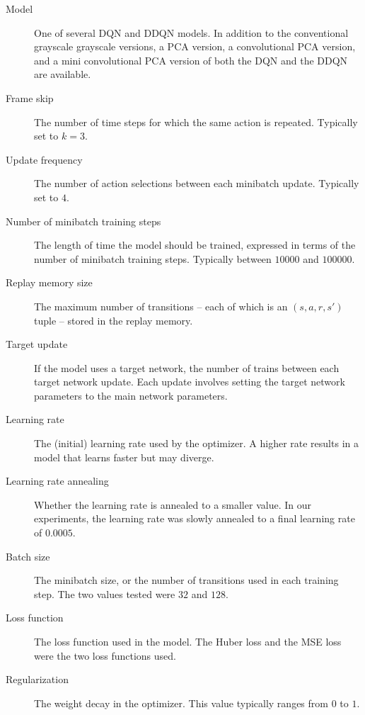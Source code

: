 \documentclass[11pt, twocolumn]{article}
\begin{document}
\begin{description}
    \item[Model] One of several DQN and DDQN models. In addition to
the conventional grayscale grayscale versions, a PCA version, a
convolutional PCA version, and a mini convolutional PCA version of
both the DQN and the DDQN are available.
    
    \item[Frame skip] The number of time steps for which the same
action is repeated. Typically set to $k = 3$.
    
    \item[Update frequency] The number of action selections between
each minibatch update. Typically set to $4$.
    
    \item[Number of minibatch training steps] The length of time the
model should be trained, expressed in terms of the number of minibatch
training steps. Typically between $10000$ and $100000$.
    
    \item[Replay memory size] The maximum number of transitions --
each of which is an $(s, a, r, s')$ tuple -- stored in the replay
memory.
    
    \item[Target update] If the model uses a target network, the
number of trains between each target network update. Each update
involves setting the target network parameters to the main network
parameters.
    
    \item[Learning rate] The (initial) learning rate used by the
optimizer. A higher rate results in a model that learns faster but may
diverge.
    
    \item[Learning rate annealing] Whether the learning rate is
annealed to a smaller value. In our experiments, the learning rate was
slowly annealed to a final learning rate of $0.0005$.
    
    \item[Batch size] The minibatch size, or the number of transitions
used in each training step. The two values tested were $32$ and $128$.
    
    \item[Loss function] The loss function used in the model. The
Huber loss and the MSE loss were the two loss functions used.
    
    \item[Regularization] The weight decay in the optimizer. This
value typically ranges from $0$ to $1$.
\end{description}
\end{document}
